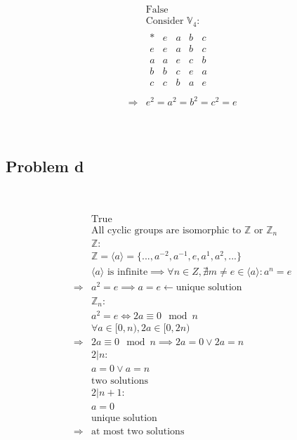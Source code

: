 \documentclass{article}
\begin{document}
\begin{equation*}
    \begin{split}
        &\text{False}\\
        &\text{Consider }\mathbb{V}_4:\\
        &\begin{array}{c|cccc}
            \ast&e&a&b&c\\
            \hline
            e&e&a&b&c\\
            a&a&e&c&b\\
            b&b&c&e&a\\
            c&c&b&a&e\\
        \end{array}\\
        \Rightarrow&e^2=a^2=b^2=c^2=e\\
    \end{split}
\end{equation*}

~

\subsection*{Problem d}

~

\begin{equation*}
    \begin{split}
        &\text{True}\\
        &\text{All cyclic groups are isomorphic to }\mathbb{Z} \text{ or }\mathbb{Z} _n\\
        &\mathbb{Z} :\\
        &\mathbb{Z}=\langle a\rangle=\{...,a^{-2},a^{-1},e,a^{1},a^{2},...\}\\
        &\langle a\rangle\text{ is infinite}\implies \forall n\in Z,\nexists m\ne e\in \langle a\rangle:a^n=e\\
        \Rightarrow& a^2=e\implies a=e\leftarrow\text{unique solution}\\
        &\mathbb{Z} _n:\\
        &a^2=e\Leftrightarrow 2a\equiv 0\mod n\\
        &\forall a\in [0,n),2a\in [0,2n)\\
        \Rightarrow&2a\equiv 0\mod n\implies 2a=0\lor 2a=n\\
        &2|n:\\
        &a=0\lor a=n\\
        &\text{two solutions}\\
        &2|n+1:\\
        &a=0\\
        &\text{unique solution}\\
        \Rightarrow&\text{at most two solutions}\\
    \end{split}
\end{equation*}
\end{document}
